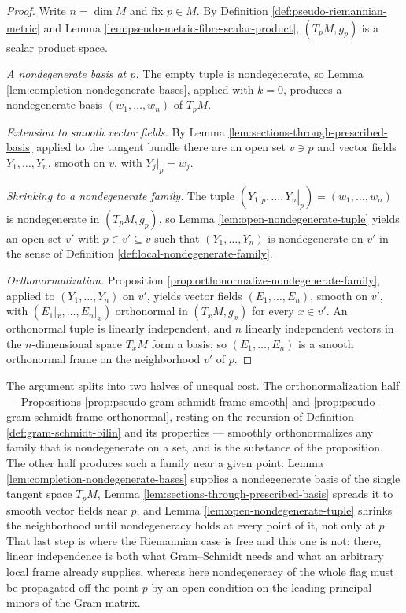 \begin{proof}
\leanok
{}
Write $n = \dim M$ and fix $p \in M$. By Definition \ref{def:pseudo-riemannian-metric} and Lemma \ref{lem:pseudo-metric-fibre-scalar-product}, $(T_pM, g_p)$ is a scalar product space.

\emph{A nondegenerate basis at $p$.} The empty tuple is nondegenerate, so Lemma \ref{lem:completion-nondegenerate-bases}, applied with $k = 0$, produces a nondegenerate basis $(w_1,\ldots,w_n)$ of $T_pM$.

\emph{Extension to smooth vector fields.} By Lemma \ref{lem:sections-through-prescribed-basis} applied to the tangent bundle there are an open set $v \ni p$ and vector fields $Y_1,\ldots,Y_n$, smooth on $v$, with $Y_j|_p = w_j$.

\emph{Shrinking to a nondegenerate family.} The tuple $(Y_1|_p,\ldots,Y_n|_p) = (w_1,\ldots,w_n)$ is nondegenerate in $(T_pM,g_p)$, so Lemma \ref{lem:open-nondegenerate-tuple} yields an open set $v'$ with $p \in v' \subseteq v$ such that $(Y_1,\ldots,Y_n)$ is nondegenerate on $v'$ in the sense of Definition \ref{def:local-nondegenerate-family}.

\emph{Orthonormalization.} Proposition \ref{prop:orthonormalize-nondegenerate-family}, applied to $(Y_1,\ldots,Y_n)$ on $v'$, yields vector fields $(E_1,\ldots,E_n)$, smooth on $v'$, with $(E_1|_x,\ldots,E_n|_x)$ orthonormal in $(T_xM, g_x)$ for every $x \in v'$. An orthonormal tuple is linearly independent, and $n$ linearly independent vectors in the $n$-dimensional space $T_xM$ form a basis; so $(E_1,\ldots,E_n)$ is a smooth orthonormal frame on the neighborhood $v'$ of $p$.
\end{proof}

The argument splits into two halves of unequal cost. The orthonormalization half — Propositions \ref{prop:pseudo-gram-schmidt-frame-smooth} and \ref{prop:pseudo-gram-schmidt-frame-orthonormal}, resting on the recursion of Definition \ref{def:gram-schmidt-bilin} and its properties — smoothly orthonormalizes any family that is nondegenerate on a set, and is the substance of the proposition. The other half produces such a family near a given point: Lemma \ref{lem:completion-nondegenerate-bases} supplies a nondegenerate basis of the single tangent space $T_pM$, Lemma \ref{lem:sections-through-prescribed-basis} spreads it to smooth vector fields near $p$, and Lemma \ref{lem:open-nondegenerate-tuple} shrinks the neighborhood until nondegeneracy holds at every point of it, not only at $p$. That last step is where the Riemannian case is free and this one is not: there, linear independence is both what Gram--Schmidt needs and what an arbitrary local frame already supplies, whereas here nondegeneracy of the whole flag must be propagated off the point $p$ by an open condition on the leading principal minors of the Gram matrix.

